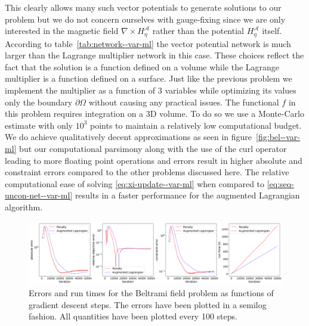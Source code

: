  This clearly allows many such vector potentials to generate solutions to our problem but we do not concern ourselves with gauge-fixing since we are only interested in the magnetic field $\nabla\times H^{\mathcal A}_{\eta}$ rather than the potential $H^{\mathcal A}_{\eta}$ itself. According to table~\ref{tab:network--var-ml} the vector potential network is much larger than the Lagrange multiplier network in this case. These choices reflect the fact that the solution is a function defined on a volume while the Lagrange multiplier is a function defined on a surface. Just like the previous problem we implement the multiplier as a function of 3 variables while optimizing its values only the boundary $\partial\Omega$ without causing any practical issues. The functional $f$ in this problem requires integration on a 3D volume. To do so we use a Monte-Carlo estimate with only $10^3$ points to maintain a relatively low computational budget. We do achieve qualitatively decent approximations as seen in figure~\ref{fig:bel--var-ml} but our computational parsimony along with the use of the curl operator leading to more floating point operations and errors result in higher absolute and constraint errors compared to the other problems discussed here. The relative computational ease of solving \eqref{eq:xi-update--var-ml} when compared to \eqref{eq:seq-uncon-net--var-ml} results in a faster performance for the augmented Lagrangian algorithm.   
\begin{figure}[!ht]
    \centering
\includegraphics[scale=0.32]{var-ml/plots/var-plots-Beltrami-error.png}
    \caption{Errors and run times for the Beltrami field problem as functions of gradient descent steps. The errors have been plotted in a semilog fashion. All quantities have been plotted every 100 steps.}
    \label{fig:bel-error--var-ml}
\end{figure}